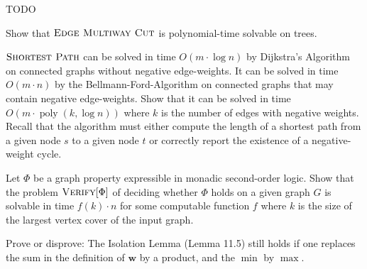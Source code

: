 \documentclass{uebung_cs}
\begin{document}
TODO

\begin{exercise}
  Show that $\textsc{Edge Multiway Cut}$ is polynomial-time solvable on trees.
\end{exercise}

\begin{exercise}
  $\textsc{Shortest Path}$ can be solved in time $O(m\cdot \log n)$ by Dijkstra's Algorithm on connected graphs without negative edge-weights. It can be solved in time $O(m \cdot n)$ by the Bellmann-Ford-Algorithm on connected graphs that may contain negative edge-weights. Show that it can be solved in time $O(m\cdot \operatorname{poly}(k,\log n))$ where $k$ is the number of edges with negative weights. Recall that the algorithm must either compute the length of a shortest path from a given node $s$ to a given node $t$ or correctly report the existence of a negative-weight cycle.
\end{exercise}

\begin{exercise}
  Let $\Phi$ be a graph property expressible in monadic second-order logic. Show that the problem $\textsc{Verify}[\Phi]$ of deciding whether $\Phi$ holds on a given graph $G$ is solvable in time $f(k)\cdot n$ for some computable function $f$ where $k$ is the size of the largest vertex cover of the input graph.
\end{exercise}

\begin{exercise}
  Prove or disprove:
  The Isolation Lemma (Lemma 11.5) still holds if one replaces the sum in the definition of $\textbf{w}$ by a product,
  and the $\min$ by $\max$.
\end{exercise}
\end{document}
